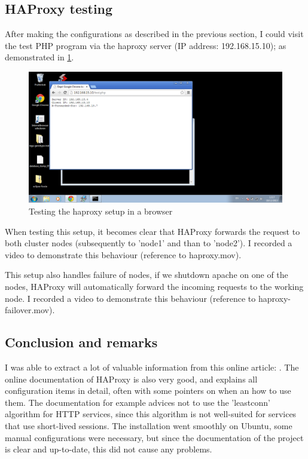 \documentclass[12pt]{report}
\begin{document}
\subsection{HAProxy testing}
After making the configurations as described in the previous section, I could visit the test PHP program via the
haproxy server (IP address: 192.168.15.10); as demonstrated in \ref{fig:haproxy_working_browser}.

\begin{figure}[h!]
  \caption{Testing the haproxy setup in a browser}
  \label{fig:haproxy_working_browser}
  \centering
    \includegraphics[scale=0.3]{pics/haproxy_working_browser.png}
\end{figure}

When testing this setup, it becomes clear that HAProxy forwards the
request to both cluster nodes (subsequently to 'node1' and than to
'node2').
I recorded a video to demonstrate this behaviour (reference to
haproxy.mov).

This setup also handles failure of nodes, if we shutdown apache on one
of the nodes, HAProxy will automatically forward the incoming requests
to the working node. 
I recorded a video to demonstrate this behaviour (reference to
haproxy-failover.mov).

\subsection{Conclusion and remarks}
I was able to extract a lot of valuable information from this online
article: \cite{haproxy_install_tutorial}. The online documentation of
 HAProxy \cite{haproxy:2013} is also very good, and explains all
 configuration items in detail, often with some pointers on when an
 how to use them. The documentation for example advices not to use the
 'leastconn' algorithm for HTTP services, since this algorithm is not
 well-suited for services that use short-lived sessions.
The installation went smoothly on Ubuntu, some manual configurations
were necessary, but since the documentation of the project is clear
and up-to-date, this did not cause any problems.
\end{document}
